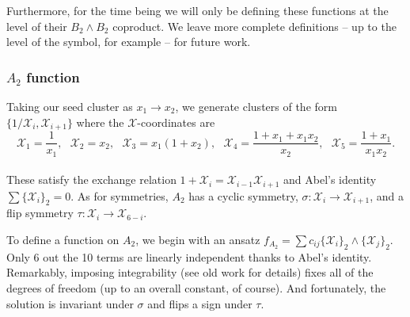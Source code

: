 \documentclass[12pt]{article}
\def\x{\mathcal{X}}
\begin{document}
Furthermore, for the time being we will only be defining these functions at the level of their $B_2\wedge B_2$ coproduct. We leave more complete definitions -- up to the level of the symbol, for example -- for future work.

\subsubsection*{$A_2$ function}

Taking our seed cluster as $x_1\to x_2$, we generate clusters of the form $\{1/\x_i, \x_{i+1}\}$ where the $\x$-coordinates are\\
\begin{equation}\label{def:xcoords}
	\x_1 = \frac{1}{x_1}, ~~~\x_2 = x_2,~~~ \x_3 = x_1 (1 + x_2),~~~ \x_4=\frac{1+x_1+x_1 x_2}{x_2},~~~ \x_5 = \frac{1+x_1}{x_1 x_2}.
\end{equation}\\
These satisfy the exchange relation $1+\x_i = \x_{i-1}\x_{i+1}$ and Abel's identity $\sum \{\x_i\}_2 = 0$. As for symmetries, $A_2$ has a cyclic symmetry, $\sigma: \x_i\to \x_{i+1}$, and a flip symmetry $\tau: \x_i \to \x_{6-i}$. 

To define a function on $A_2$, we begin with an ansatz $f_{A_2} = \sum c_{ij} \{\x_i\}_2 \wedge \{\x_j\}_2$. Only 6 out the 10 terms are linearly independent thanks to Abel's identity. Remarkably, imposing integrability (see old work for details) fixes all of the degrees of freedom (up to an overall constant, of course). And fortunately, the solution is invariant under $\sigma$ and flips a sign under $\tau$. 
\end{document}
